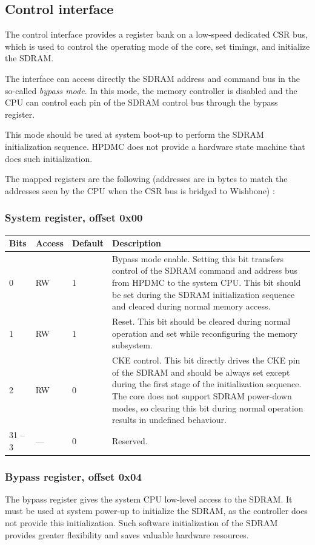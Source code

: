 \documentclass[a4paper,11pt]{article}
\begin{document}
\subsection{Control interface}
The control interface provides a register bank on a low-speed dedicated CSR bus, which is used to control the operating mode of the core, set timings, and initialize the SDRAM.

The interface can access directly the SDRAM address and command bus in the so-called \textit{bypass mode}. In this mode, the memory controller is disabled and the CPU can control each pin of the SDRAM control bus through the bypass register.

This mode should be used at system boot-up to perform the SDRAM initialization sequence. HPDMC does not provide a hardware state machine that does such initialization.

The mapped registers are the following (addresses are in bytes to match the addresses seen by the CPU when the CSR bus is bridged to Wishbone) :

\subsubsection{System register, offset 0x00}
\begin{tabular}{|p{1.5cm}|l|l|p{10cm}|}
\hline
\bf Bits & \bf Access & \bf Default & \bf Description \\
\hline
0 & RW & 1 & Bypass mode enable. Setting this bit transfers control of the SDRAM command and address bus from HPDMC to the system CPU. This bit should be set during the SDRAM initialization sequence and cleared during normal memory access. \\
\hline
1 & RW & 1 & Reset. This bit should be cleared during normal operation and set while reconfiguring the memory subsystem. \\
\hline
2 & RW & 0 & CKE control. This bit directly drives the CKE pin of the SDRAM and should be always set except during the first stage of the initialization sequence. The core does not support SDRAM power-down modes, so clearing this bit during normal operation results in undefined behaviour. \\
\hline
31 -- 3 & --- & 0 & Reserved. \\
\hline
\end{tabular}

\subsubsection{Bypass register, offset 0x04}
The bypass register gives the system CPU low-level access to the SDRAM. It must be used at system power-up to initialize the SDRAM, as the controller does not provide this initialization. Such software initialization of the SDRAM provides greater flexibility and saves valuable hardware resources.
\end{document}

